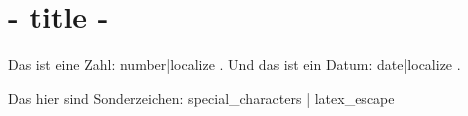 \documentclass{article}
\begin{document}
\section{ {{- title -}} }


Das ist eine Zahl: {{ number|localize }}. Und das ist ein Datum: {{ date|localize }}.

Das hier sind Sonderzeichen: {{ special_characters | latex_escape }}
\end{document}

